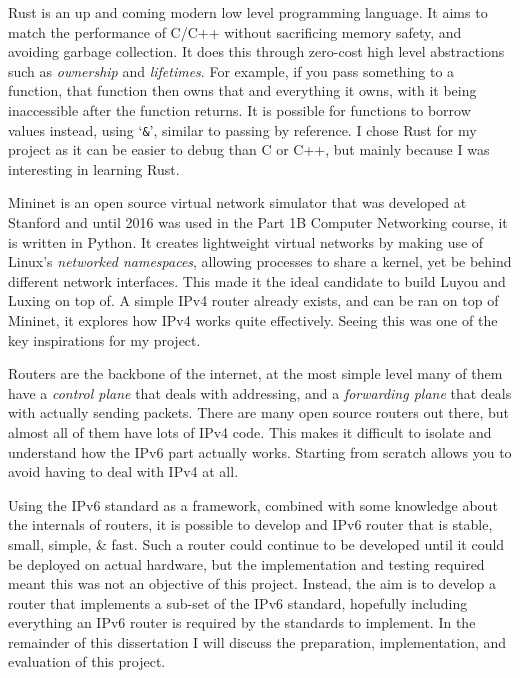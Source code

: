 \documentclass[12pt,a4paper,twoside,openright]{report}
\begin{document}
\bigskip

Rust\cite{rust} is an up and coming modern low level programming language. It aims to match the performance of C/C++ without sacrificing memory safety, and avoiding garbage collection. It does this through zero-cost high level abstractions such as \textit{ownership} and \textit{lifetimes}. For example, if you pass something to a function, that function then owns that and everything it owns, with it being inaccessible after the function returns. It is possible for functions to borrow values instead, using `\verb!&!', similar to passing by reference.  I chose Rust for my project as it can be easier to debug than C or C++, but mainly because I was interesting in learning Rust.

\bigskip

Mininet\cite{mininet} is an open source virtual network simulator that was developed at Stanford and until 2016 was used in the Part 1B Computer Networking course, it is written in Python.  It creates lightweight virtual networks by making use of Linux's \textit{networked namespaces}, allowing processes to share a kernel, yet be behind different network interfaces. This made it the ideal candidate to build Luyou and Luxing on top of. A simple IPv4 router\cite{simple_router} already exists, and can be ran on top of Mininet, it explores how IPv4 works quite effectively.  Seeing this was one of the key inspirations for my project.

\bigskip

Routers are the backbone of the internet, at the most simple level many of them have a \textit{control plane} that deals with addressing, and a \textit{forwarding plane} that deals with actually sending packets. There are many open source routers out there, but almost all of them have lots of IPv4 code. This makes it difficult to isolate and understand how the IPv6 part actually works.  Starting from scratch allows you to avoid having to deal with IPv4 at all.  

\bigskip

Using the IPv6 standard as a framework, combined with some knowledge about the internals of routers, it is possible to develop and IPv6 router that is stable, small, simple, \& fast.  Such a router could continue to be developed until it could be deployed on actual hardware, but the implementation and testing required meant this was not an objective of this project.  Instead, the aim is to develop a router that implements a sub-set of the IPv6 standard, hopefully including everything an IPv6 router is required by the standards to implement.  In the remainder of this dissertation I will discuss the preparation, implementation, and evaluation of this project.
\end{document}
